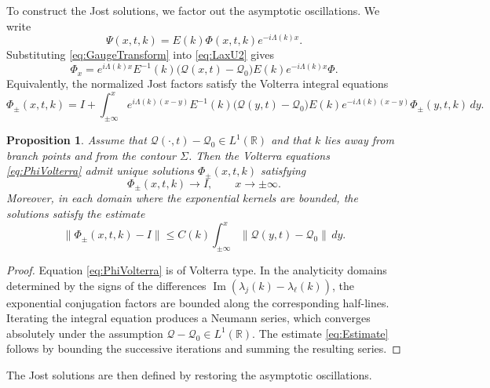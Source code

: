 \documentclass[11pt]{amsart}
\newtheorem{proposition}{Proposition}[section]
\theoremstyle{definition}
\numberwithin{equation}{section}
\begin{document}
To construct the Jost solutions, we factor out the asymptotic oscillations. We write
\begin{equation}
\Psi(x,t,k)=E(k)\Phi(x,t,k)e^{-i\Lambda(k)x}.
\label{eq:GaugeTransform}
\end{equation}
Substituting \eqref{eq:GaugeTransform} into \eqref{eq:LaxU2} gives
\begin{equation}
\Phi_x =
e^{i\Lambda(k)x}
E^{-1}(k)
\bigl(\mathcal Q(x,t)-\mathcal Q_0\bigr)
E(k)
e^{-i\Lambda(k)x}
\Phi .
\label{eq:PhiEq}
\end{equation}
Equivalently, the normalized Jost factors satisfy the Volterra integral equations
\begin{equation}
\Phi_\pm(x,t,k)
=
I+
\int_{\pm\infty}^{x}
e^{i\Lambda(k)(x-y)}
E^{-1}(k)
\bigl(\mathcal Q(y,t)-\mathcal Q_0\bigr)
E(k)
e^{-i\Lambda(k)(x-y)}
\Phi_\pm(y,t,k)\,dy .
\label{eq:PhiVolterra}
\end{equation}

\begin{proposition}
Assume that $\mathcal Q(\cdot,t)-\mathcal Q_0\in L^1(\mathbb R)$ and that $k$ lies away from branch points and from the contour $\Sigma$. Then the Volterra equations \eqref{eq:PhiVolterra} admit unique solutions $\Phi_\pm(x,t,k)$ satisfying
\begin{equation}
\Phi_\pm(x,t,k)\to I,
\qquad x\to \pm\infty.
\label{eq:PhiAsympt}
\end{equation}
Moreover, in each domain where the exponential kernels are bounded, the solutions satisfy the estimate
\begin{equation}
\|\Phi_\pm(x,t,k)-I\|
\le
C(k)\int_{\pm\infty}^{x}
\|\mathcal Q(y,t)-\mathcal Q_0\|\,dy .
\label{eq:Estimate}
\end{equation}
\end{proposition}

\begin{proof}
Equation \eqref{eq:PhiVolterra} is of Volterra type. In the analyticity domains determined by the signs of the differences $\operatorname{Im}(\lambda_j(k)-\lambda_\ell(k))$, the exponential conjugation factors are bounded along the corresponding half-lines. Iterating the integral equation produces a Neumann series, which converges absolutely under the assumption $\mathcal Q-\mathcal Q_0\in L^1(\mathbb R)$. The estimate \eqref{eq:Estimate} follows by bounding the successive iterations and summing the resulting series.
\end{proof}

The Jost solutions are then defined by restoring the asymptotic oscillations.
\end{document}

